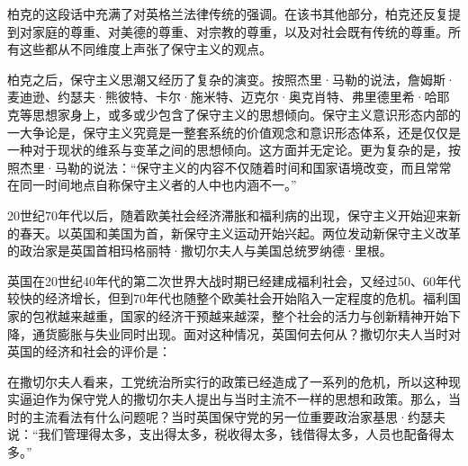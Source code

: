 
柏克的这段话中充满了对英格兰法律传统的强调。在该书其他部分，柏克还反复提到对家庭的尊重、对美德的尊重、对宗教的尊重，以及对社会既有传统的尊重。所有这些都从不同维度上声张了保守主义的观点。

柏克之后，保守主义思潮又经历了复杂的演变。按照杰里·马勒的说法，詹姆斯·麦迪逊、约瑟夫·熊彼特、卡尔·施米特、迈克尔·奥克肖特、弗里德里希·哈耶克等思想家身上，或多或少包含了保守主义的思想倾向。保守主义意识形态内部的一大争论是，保守主义究竟是一整套系统的价值观念和意识形态体系，还是仅仅是一种对于现状的维系与变革之间的思想倾向。这方面并无定论。更为复杂的是，按照杰里·马勒的说法：“保守主义的内容不仅随着时间和国家语境改变，而且常常在同一时间地点自称保守主义者的人中也内涵不一。”


20世纪70年代以后，随着欧美社会经济滞胀和福利病的出现，保守主义开始迎来新的春天。以英国和美国为首，新保守主义运动开始兴起。两位发动新保守主义改革的政治家是英国首相玛格丽特·撒切尔夫人与美国总统罗纳德·里根。

英国在20世纪40年代的第二次世界大战时期已经建成福利社会，又经过50、60年代较快的经济增长，但到70年代也随整个欧美社会开始陷入一定程度的危机。福利国家的包袱越来越重，国家的经济干预越来越深，整个社会的活力与创新精神开始下降，通货膨胀与失业同时出现。面对这种情况，英国何去何从？撒切尔夫人当时对英国的经济和社会的评价是：


在撒切尔夫人看来，工党统治所实行的政策已经造成了一系列的危机，所以这种现实逼迫作为保守党人的撒切尔夫人提出与当时主流不一样的思想和政策。那么，当时的主流看法有什么问题呢？当时英国保守党的另一位重要政治家基思·约瑟夫说：“我们管理得太多，支出得太多，税收得太多，钱借得太多，人员也配备得太多。”

